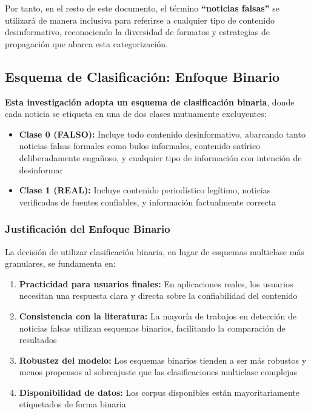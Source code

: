 Por tanto, en el resto de este documento, el término \textbf{``noticias falsas''} se utilizará de manera inclusiva para referirse a cualquier tipo de contenido desinformativo, reconociendo la diversidad de formatos y estrategias de propagación que abarca esta categorización.

\subsection{Esquema de Clasificación: Enfoque Binario}
\label{subsec:esquema_clasificacion}

\textbf{Esta investigación adopta un esquema de clasificación binaria}, donde cada noticia se etiqueta en una de dos clases mutuamente excluyentes:

\begin{itemize}
    \item \textbf{Clase 0 (FALSO):} Incluye todo contenido desinformativo, abarcando tanto noticias falsas formales como bulos informales, contenido satírico deliberadamente engañoso, y cualquier tipo de información con intención de desinformar
    \item \textbf{Clase 1 (REAL):} Incluye contenido periodístico legítimo, noticias verificadas de fuentes confiables, y información factualmente correcta
\end{itemize}

\subsubsection{Justificación del Enfoque Binario}

La decisión de utilizar clasificación binaria, en lugar de esquemas multiclase más granulares, se fundamenta en:

\begin{enumerate}
    \item \textbf{Practicidad para usuarios finales:} En aplicaciones reales, los usuarios necesitan una respuesta clara y directa sobre la confiabilidad del contenido
    \item \textbf{Consistencia con la literatura:} La mayoría de trabajos en detección de noticias falsas utilizan esquemas binarios, facilitando la comparación de resultados
    \item \textbf{Robustez del modelo:} Los esquemas binarios tienden a ser más robustos y menos propensos al sobreajuste que las clasificaciones multiclase complejas
    \item \textbf{Disponibilidad de datos:} Los corpus disponibles están mayoritariamente etiquetados de forma binaria
\end{enumerate}

